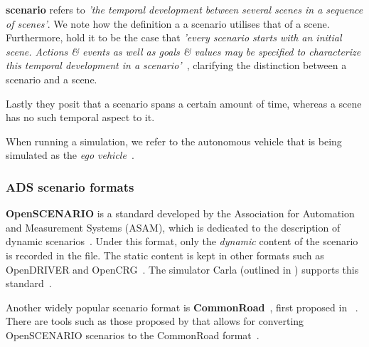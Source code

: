 \textbf{scenario} refers to \textit{'the temporal development between several scenes in a sequence
    of scenes'}\cite[986]{scenes}. We note how the definition a a scenario utilises that of a scene.
Furthermore, \citeauthor{scenes} hold it to be the case that \textit{'every scenario starts with an
    initial scene. Actions \& events as well as goals \& values may be  specified to characterize
    this temporal development in a scenario'}~\cite[986]{scenes}, clarifying the distinction
between a scenario and a scene.

Lastly they posit that a scenario spans a certain amount of time, whereas a scene has no such
temporal aspect to it.


When running a simulation, we refer to the autonomous vehicle that is being
simulated as the \textit{ego vehicle}~\cite{egoDefinition}.



\subsubsection{ADS scenario formats}\label{sec:adsScenarioFormats}

\textbf{OpenSCENARIO} is a standard developed by the Association for Automation and
Measurement Systems (ASAM), which is dedicated to the description of dynamic
scenarios~\cite[651]{generatingOpenScenario}. Under this format, only the
\textit{dynamic} content of the scenario is recorded in the file. The static
content is kept in other formats such as OpenDRIVER and
OpenCRG~\cite[652]{generatingOpenScenario}. The simulator Carla (outlined in
) supports this
standard~\cite[652]{generatingOpenScenario}.

Another widely popular scenario format is
\textbf{CommonRoad}~\cite[4941]{convOpenScenarioToCR}, first proposed in
~\cite{commonRoadOG}. There are tools such as those
proposed by \citeauthor{convOpenScenarioToCR} that allows for converting
OpenSCENARIO scenarios to the CommonRoad
format~\cite[4941]{convOpenScenarioToCR}.


